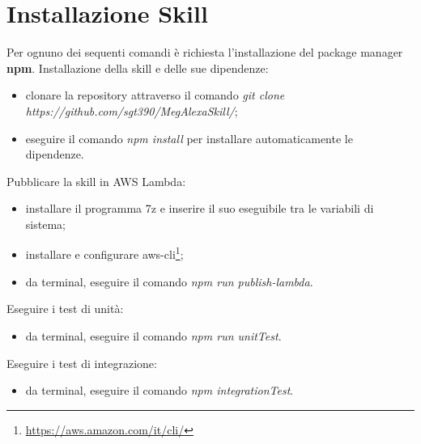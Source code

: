 \section{Installazione Skill}
\label{installazioneSkill}
Per ognuno dei sequenti comandi è richiesta l'installazione del package manager \textbf{npm}.
Installazione della skill e delle sue dipendenze:
\begin{itemize}
    \item clonare la repository attraverso il comando \textit{git clone\\https://github.com/sgt390/MegAlexaSkill/};
    \item eseguire il comando \textit{npm install} per installare automaticamente le dipendenze.
\end{itemize}
Pubblicare la skill in AWS Lambda:
\begin{itemize}
    \item installare il programma 7z e inserire il suo eseguibile tra le variabili di sistema;
    \item installare e configurare aws-cli\footnote{\url{https://aws.amazon.com/it/cli/}};
    \item da terminal, eseguire il comando \textit{npm run publish-lambda}.
\end{itemize}
Eseguire i test di unità:
\begin{itemize}
    \item da terminal, eseguire il comando \textit{npm run unitTest}.
\end{itemize}
Eseguire i test di integrazione:
\begin{itemize}
    \item da terminal, eseguire il comando \textit{npm integrationTest}.
\end{itemize}